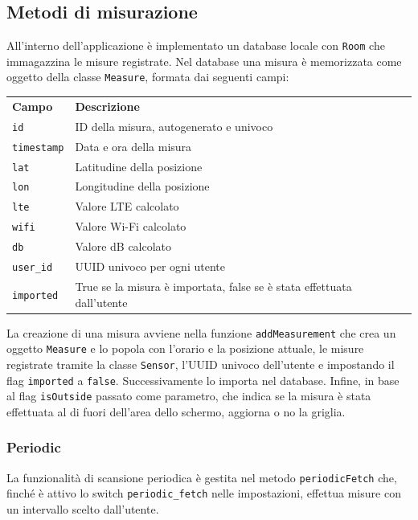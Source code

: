 \documentclass[11pt]{article}
\begin{document}
\subsection{Metodi di misurazione} %
All'interno dell'applicazione è implementato un database locale con \texttt{Room} che immagazzina le misure registrate. Nel database una misura è memorizzata come oggetto della classe \texttt{Measure}, formata dai seguenti campi:
\begin{table}[H]
    \begin{tabular}{l|l}
        \textbf{Campo} & \textbf{Descrizione} \\
        \texttt{id} & ID della misura, autogenerato e univoco \\
        \texttt{timestamp} & Data e ora della misura \\
        \texttt{lat} & Latitudine della posizione \\
        \texttt{lon} & Longitudine della posizione \\
        \texttt{lte} & Valore LTE calcolato \\
        \texttt{wifi} & Valore Wi-Fi calcolato \\
        \texttt{db} & Valore dB calcolato \\
        \texttt{user\_id} & UUID univoco per ogni utente \\
        \texttt{imported} & True se la misura è importata, false se è stata effettuata dall'utente
    \end{tabular}
\end{table}
\noindent La creazione di una misura avviene nella funzione \texttt{addMeasurement} che crea un oggetto \texttt{Measure} e lo popola con l'orario e la posizione attuale, le misure registrate tramite la classe \texttt{Sensor}, l'UUID univoco dell'utente e impostando il flag \texttt{imported} a \texttt{false}. Successivamente lo importa nel database. Infine, in base al flag \texttt{isOutside} passato come parametro, che indica se la misura è stata effettuata al di fuori dell'area dello schermo, aggiorna o no la griglia.
\subsubsection{Periodic}
La funzionalità di scansione periodica è gestita nel metodo \texttt{periodicFetch} che, finché è attivo lo switch \texttt{periodic\_fetch} nelle impostazioni, effettua misure con un intervallo scelto dall'utente.
\end{document}
